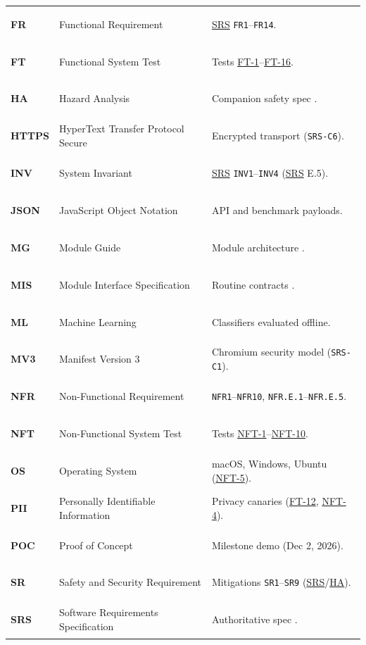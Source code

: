 \documentclass[12pt, titlepage]{article}
\newcommand{\HA}{\hyperlink{vnv-acr-ha}{HA}}
\newcommand{\SRS}{\hyperlink{vnv-acr-srs}{SRS}}
\begin{document}
\begin{tabularx}{\textwidth}{l P{4.8cm} Y}
\hypertarget{vnv-acr-fr}{\textbf{FR}} & Functional Requirement & \SRS{} \texttt{FR1}--\texttt{FR14}.\\
\hypertarget{vnv-acr-ft}{\textbf{FT}} & Functional System Test & Tests \hyperref[test:FT-1]{FT-1}--\hyperref[test:FT-16]{FT-16}.\\
\hypertarget{vnv-acr-ha}{\textbf{HA}} & Hazard Analysis & Companion safety spec \cite{VerityHA2026}.\\
\hypertarget{vnv-acr-https}{\textbf{HTTPS}} & HyperText Transfer Protocol Secure & Encrypted transport (\texttt{SRS-C6}).\\
\hypertarget{vnv-acr-inv}{\textbf{INV}} & System Invariant & \SRS{} \texttt{INV1}--\texttt{INV4} (\SRS{} E.5).\\
\hypertarget{vnv-acr-json}{\textbf{JSON}} & JavaScript Object Notation & API and benchmark payloads.\\
\hypertarget{vnv-acr-mg}{\textbf{MG}} & Module Guide & Module architecture \cite{VerityMG2026}.\\
\hypertarget{vnv-acr-mis}{\textbf{MIS}} & Module Interface Specification & Routine contracts \cite{VerityMIS2026}.\\
\hypertarget{vnv-acr-ml}{\textbf{ML}} & Machine Learning & Classifiers evaluated offline.\\
\hypertarget{vnv-acr-mv3}{\textbf{MV3}} & Manifest Version 3 & Chromium security model (\texttt{SRS-C1}).\\
\hypertarget{vnv-acr-nfr}{\textbf{NFR}} & Non-Functional Requirement & \texttt{NFR1}--\texttt{NFR10}, \texttt{NFR.E.1}--\texttt{NFR.E.5}.\\
\hypertarget{vnv-acr-nft}{\textbf{NFT}} & Non-Functional System Test & Tests \hyperref[test:NFT-1]{NFT-1}--\hyperref[test:NFT-10]{NFT-10}.\\
\hypertarget{vnv-acr-os}{\textbf{OS}} & Operating System & macOS, Windows, Ubuntu (\hyperref[test:NFT-5]{NFT-5}).\\
\hypertarget{vnv-acr-pii}{\textbf{PII}} & Personally Identifiable Information & Privacy canaries (\hyperref[test:FT-12]{FT-12}, \hyperref[test:NFT-4]{NFT-4}).\\
\hypertarget{vnv-acr-poc}{\textbf{POC}} & Proof of Concept & Milestone demo (Dec 2, 2026).\\
\hypertarget{vnv-acr-sr}{\textbf{SR}} & Safety and Security Requirement & Mitigations \texttt{SR1}--\texttt{SR9} (\SRS{}/\HA{}).\\
\hypertarget{vnv-acr-srs}{\textbf{SRS}} & Software Requirements Specification & Authoritative spec \cite{VeritySRS2026}.\\

\end{tabularx}
\end{document}
